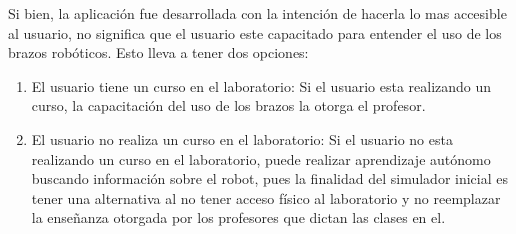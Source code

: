 Si bien, la aplicación fue desarrollada con la intención de hacerla lo mas accesible al usuario, no significa que el usuario este capacitado para entender el uso de los brazos robóticos.
Esto lleva a tener dos opciones:
\begin{enumerate}
    \item El usuario tiene un curso en el laboratorio: Si el usuario esta realizando un curso, la capacitación del uso de los brazos la otorga el profesor.
    \item El usuario no realiza un curso en el laboratorio: Si el usuario no esta realizando un curso en el laboratorio, puede realizar aprendizaje autónomo buscando información sobre el robot, pues la finalidad del simulador inicial es tener una alternativa al no tener acceso físico al laboratorio y no reemplazar la enseñanza otorgada por los profesores que dictan las clases en el.
\end{enumerate}